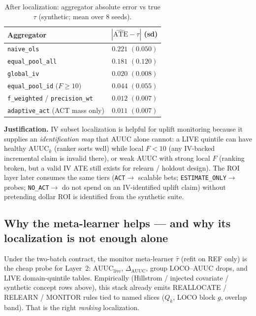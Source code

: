 \begin{table}[H]
\centering
\small
\caption{After localization: aggregator absolute error vs true $\tau$
(synthetic; mean over 8 seeds).}
\label{tab:iv-agg}
\begin{tabular}{@{}lr@{}}
\toprule
Aggregator & $|\widehat{\mathrm{ATE}}-\tau|$ (sd) \\
\midrule
\texttt{naive\_ols} & $0.221$ $(0.050)$ \\
\texttt{equal\_pool\_all} & $0.181$ $(0.120)$ \\
\texttt{global\_iv} & $0.020$ $(0.008)$ \\
\texttt{equal\_pool\_id} ($F\ge 10$) & $0.044$ $(0.055)$ \\
\texttt{f\_weighted} / \texttt{precision\_wt} & $\mathbf{0.012}$ $(0.007)$ \\
\texttt{adaptive\_act} (ACT mass only) & $\mathbf{0.011}$ $(0.007)$ \\
\bottomrule
\end{tabular}
\end{table}

\noindent\textbf{Justification.}
IV subset localization is helpful for uplift monitoring because it supplies
an \emph{identification map} that AUUC alone cannot: a LIVE quintile can
have healthy $\mathrm{AUUC}_k$ (ranker sorts well) while local $F<10$
(any IV-backed incremental claim is invalid there), or weak AUUC with
strong local $F$ (ranking broken, but a valid IV ATE still exists for
relearn / holdout design).
The ROI layer later consumes the same tiers
(\texttt{ACT}$\to$ scalable bets; \texttt{ESTIMATE\_ONLY}$\to$ probes;
\texttt{NO\_ACT}$\to$ do not spend on an IV-identified uplift claim)
without pretending dollar ROI is identified from the synthetic suite.

\subsection{Why the meta-learner helps --- and why its localization is not enough alone}
\label{sec:meta-helps}

Under the two-batch contract, the monitor meta-learner $\hat\tau$ (refit on
REF only) is the cheap probe for Layer~2: $\mathrm{AUUC}_{\mathrm{live}}$,
$\Delta_{\mathrm{AUUC}}$, group LOCO--AUUC drops, and LIVE domain-quintile
tables.
Empirically (Hillstrom / injected covariate / synthetic concept rows above),
this stack already emits \textsc{REALLOCATE} / \textsc{RELEARN} /
\textsc{MONITOR} rules tied to named slices
($Q_k$, LOCO block $g$, overlap band).
That is the right \emph{ranking} localization.

